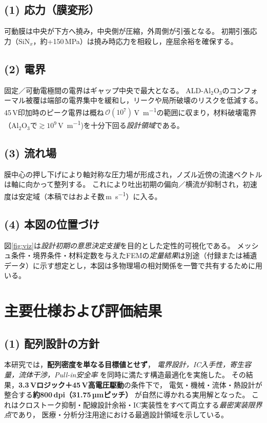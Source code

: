 \documentclass[conference]{IEEEtran}
\begin{document}
\subsection*{(1) 応力（膜変形）}
可動膜は中央が下方へ撓み，中央側が圧縮，外周側が引張となる。
初期引張応力（SiN$_x$，約+150\,MPa）は撓み時応力を相殺し，座屈余裕を確保する。

\subsection*{(2) 電界}
固定／可動電極間の電界はギャップ中央で最大となる。
ALD-Al$_2$O$_3$のコンフォーマル被覆は端部の電界集中を緩和し，リークや局所破壊のリスクを低減する。
45\,V印加時のピーク電界は概ね\,$\mathcal{O}(10^{7})$\,\si{\volt\per\meter}の範囲に収まり，材料破壊電界（Al$_2$O$_3$で$\gtrsim 10^{9}$\,\si{\volt\per\meter})を十分下回る\emph{設計領域}である。

\subsection*{(3) 流れ場}
膜中心の押し下げにより軸対称な圧力場が形成され，ノズル近傍の流速ベクトルは軸に向かって整列する。
これにより吐出初期の偏向／横流が抑制され，初速度は安定域（本稿ではおよそ数\,\si{\meter\per\second}）に入る。

\subsection*{(4) 本図の位置づけ}
図\ref{fig:viz}は\emph{設計初期の意思決定支援}を目的とした定性的可視化である。
メッシュ条件・境界条件・材料定数を与えたFEMの\emph{定量結果}は別途（付録または補遺データ）に示す想定とし，本図は多物理場の相対関係を一瞥で共有するために用いる。

\section{主要仕様および評価結果}

\subsection*{(1) 配列設計の方針}
本研究では，\textbf{配列密度を単なる目標値とせず}，
\emph{電界設計，IC入手性，寄生容量，流体干渉，Pull-in安全率}
を同時に満たす構造最適化を実施した。
その結果，\textbf{3.3\,Vロジック＋45\,V高電圧駆動}の条件下で，
電気・機械・流体・熱設計が整合する\textbf{約800\,dpi（31.75\,µmピッチ）}
が自然に導かれる実用解となった。
これはクロストーク抑制・配線設計余裕・IC実装性をすべて両立する\emph{最密実装限界点}であり，
医療・分析分注用途における最適設計領域を示している。
\end{document}
